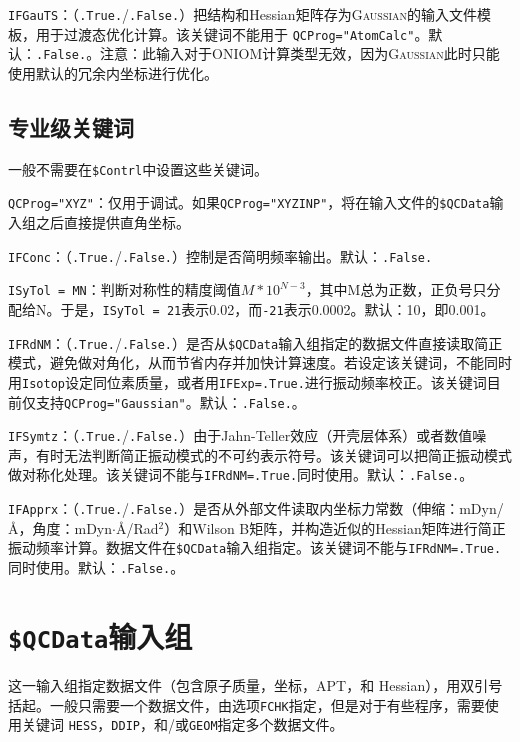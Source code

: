 \documentclass[12pt,a4paper,openany,twoside,cap,UTF8]{ctexbook}
\begin{document}
\bigskip{}
\verb|IFGauTS|：（\verb|.True.|/\verb|.False.|）把结构和Hessian矩阵存为\textsc{Gaussian}的输入文件模板，用于过渡态优化计算。该关键词不能用于
\verb|QCProg="AtomCalc"|。默认：\verb|.False.|。注意：此输入对于ONIOM计算类型无效，因为\textsc{Gaussian}此时只能使用默认的冗余内坐标进行优化。

\subsection{专业级关键词} \label{subsec:inp-qcdata-expert}

一般不需要在\texttt{\$Contrl}中设置这些关键词。

\bigskip{}
\verb|QCProg="XYZ"|：仅用于调试。如果\verb|QCProg="XYZINP"|，将在输入文件的\texttt{\$QCData}输入组之后直接提供直角坐标。

\bigskip{}
\verb|IFConc|：（\verb|.True.|/\verb|.False.|）控制是否简明频率输出。默认：\verb|.False.|

\bigskip{}
\verb|ISyTol = MN|：判断对称性的精度阈值$M*10^{N-3}$，其中M总为正数，正负号只分配给N。于是，\verb|ISyTol = 21|表示0.02，而\verb|-21|表示0.0002。默认：10，即0.001。

\bigskip{}
\verb|IFRdNM|：（\verb|.True.|/\verb|.False.|）是否从\texttt{\$QCData}输入组指定的数据文件直接读取简正模式，避免做对角化，从而节省内存并加快计算速度。若设定该关键词，不能同时用\verb|Isotop|设定同位素质量，或者用\verb|IFExp=.True.|进行振动频率校正。该关键词目前仅支持\verb|QCProg="Gaussian"|。默认：\verb|.False.|。

\bigskip{}
\verb|IFSymtz|：（\verb|.True.|/\verb|.False.|）由于Jahn-Teller效应（开壳层体系）或者数值噪声，有时无法判断简正振动模式的不可约表示符号。该关键词可以把简正振动模式做对称化处理。该关键词不能与\verb|IFRdNM=.True.|同时使用。默认：\verb|.False.|。

\bigskip{}
\verb|IFApprx|：（\verb|.True.|/\verb|.False.|）是否从外部文件读取内坐标力常数（伸缩：mDyn/\AA，角度：mDyn$\cdot$\AA/Rad$^2$）和Wilson B矩阵，并构造近似的Hessian矩阵进行简正振动频率计算。数据文件在\texttt{\$QCData}输入组指定。该关键词不能与\verb|IFRdNM=.True.|同时使用。默认：\verb|.False.|。


\section{\texttt{\$QCData}输入组} \label{sec:inp-qcdata}

这一输入组指定数据文件（包含原子质量，坐标，APT，和 Hessian），用双引号括起。一般只需要一个数据文件，由选项\verb|FCHK|指定，但是对于有些程序，需要使用关键词
\verb|HESS|，\verb|DDIP|，和/或\verb|GEOM|指定多个数据文件。
\end{document}

